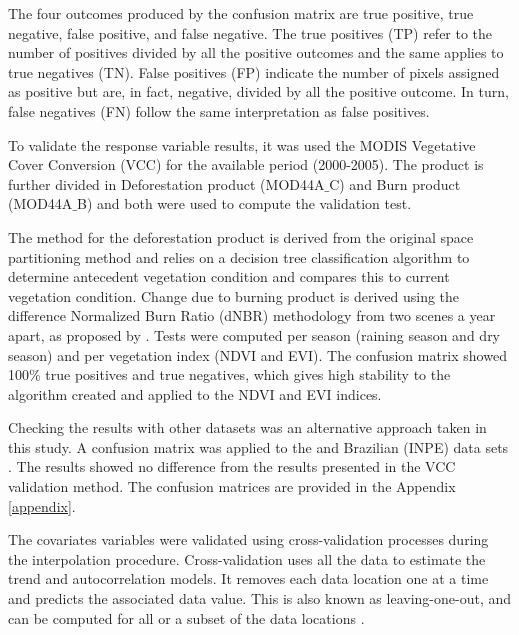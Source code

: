 The four outcomes produced by the confusion matrix are true positive, true negative, false positive, and false negative. The true positives (TP) refer to the number of positives divided by all the positive outcomes and the same applies to true negatives (TN). False positives (FP) indicate the number of pixels assigned as positive but are, in fact, negative, divided by all the positive outcome. In turn, false negatives (FN) follow the same interpretation as false positives. 




To validate the response variable results, it was used the MODIS Vegetative Cover Conversion (VCC) for the available period (2000-2005). The product is further divided in Deforestation product (MOD44A${\_}$C) and Burn product (MOD44A$\_$B) and both were used to compute the validation test. 

The method for the deforestation product is derived from the original space partitioning method \citep{zhan_2002} and relies on a decision tree classification algorithm \citep{breiman_1984} to determine antecedent vegetation condition and compares this to current vegetation condition. Change due to burning product is derived using the difference Normalized Burn Ratio (dNBR) methodology from two scenes a year apart, as proposed by \citet{key_2004}.  Tests were computed per season (raining season and dry season) and per vegetation index (NDVI and EVI). The confusion matrix showed 100\% true positives and true negatives, which gives high stability to the algorithm created and applied to the NDVI and EVI indices. 


Checking the results with other datasets was an alternative approach taken in this study. A confusion matrix was applied to the \citet{Hansen_2013} and Brazilian (INPE) data sets \citep{brito_2018}. The results showed no difference from the results presented in the VCC validation method. The confusion matrices are provided in the Appendix \ref{appendix}. 

The covariates variables were validated using cross-validation processes during the interpolation procedure. Cross-validation uses all the data to estimate the trend and autocorrelation models. It removes each data location one at a time and predicts the associated data value. This is also known as leaving-one-out, and can be computed for all or a subset of the data locations \citep{esri_2016}.

